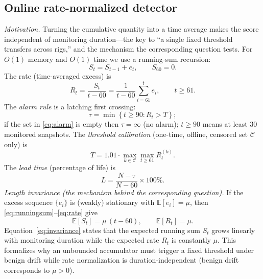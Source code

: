 \documentclass[journal]{IEEEtran}
\newcommand{\E}{\mathbb{E}}
\begin{document}
\subsection{Online rate-normalized detector}\label{sec:rate}
\emph{Motivation.} Turning the cumulative quantity into a time average makes the score independent of monitoring duration---the key to ``a single fixed threshold transfers across rigs,'' and the mechanism the corresponding question tests. For $O(1)$ memory and $O(1)$ time we use a running-sum recursion:
\begin{equation}
S_t=S_{t-1}+e_t,\qquad S_{60}=0.
\label{eq:runningsum}
\end{equation}
The rate (time-averaged excess) is
\begin{equation}
R_t=\frac{S_t}{t-60}=\frac{1}{t-60}\sum_{i=61}^{t}e_i,\qquad t\ge61.
\label{eq:rate}
\end{equation}
The \emph{alarm rule} is a latching first crossing:
\begin{equation}
\tau=\min\left\{t\ge90:R_t>T\right\};
\label{eq:alarm}
\end{equation}
if the set in \eqref{eq:alarm} is empty then $\tau=\infty$ (no alarm); $t\ge90$ means at least 30 monitored snapshots. The \emph{threshold calibration} (one-time, offline, censored set $\mathcal{C}$ only) is
\begin{equation}
T=1.01\cdot\max_{k\in\mathcal{C}}\max_{t\ge61}R_t^{(k)}.
\label{eq:threshold}
\end{equation}
The \emph{lead time} (percentage of life) is
\begin{equation}
L=\frac{N-\tau}{N-60}\times100\%.
\label{eq:leadtime}
\end{equation}
\emph{Length invariance (the mechanism behind the corresponding question).} If the excess sequence $\{e_i\}$ is (weakly) stationary with $\E[e_i]=\mu$, then \eqref{eq:runningsum}--\eqref{eq:rate} give
\begin{equation}
\E[S_t]=\mu\,(t-60),\qquad \E[R_t]=\mu.
\label{eq:invariance}
\end{equation}
Equation~\eqref{eq:invariance} states that the expected running sum $S_t$ grows linearly with monitoring duration while the expected rate $R_t$ is constantly $\mu$. This formalizes why an unbounded accumulator must trigger a fixed threshold under benign drift while rate normalization is duration-independent (benign drift corresponds to $\mu>0$).
\end{document}
